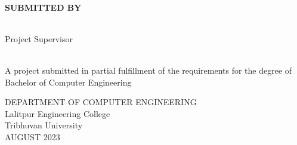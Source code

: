 \begin{center}
    \linespread{1.6}
    \thispagestyle{empty}
    \textbf{\large{\thetitle}} \\
    \vspace{2cm}

    \textbf{SUBMITTED BY} \\
    {\theauthor} \\

    \vspace{2cm}

    Project Supervisor\\
    {\thesupervisor} \\

    \vspace{2.2cm}

    A project submitted in partial fulfillment of the requirements for the degree of\\
    Bachelor of Computer Engineering

    \vspace{3cm}

    DEPARTMENT OF COMPUTER ENGINEERING \\
    Lalitpur Engineering College\\
    Tribhuvan University\\
    \vspace{2.4 in}
    AUGUST 2023

\end{center}
